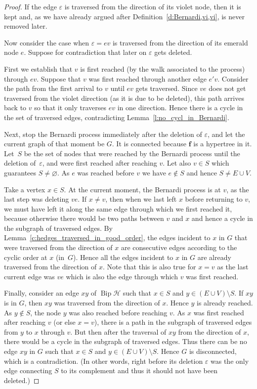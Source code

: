 \documentclass[ALCO,ThmDefs,Unicode,epreuves]{cedram}
\newcommand{\HH}{\mathcal H}
\DeclareMathOperator{\bip}{Bip}
\begin{document}
\begin{proof}
If the edge $\varepsilon$ is traversed from the direction of its violet node, then it is kept and, as we have already argued after Definition~\ref{d:Bernardi,vi,vi}, is never removed later.
	
Now consider the case when $\varepsilon=ev$ is traversed from the direction of its emerald node $e$. Suppose for contradiction that later on $\varepsilon$ gets deleted. 

First we establish that $v$ is first reached (by the walk associated to the process) through $ev$. Suppose that $v$ was first reached through another edge $e'v$. Consider the path from the first arrival to $v$ until $ev$ gets traversed. Since $ve$ does not get traversed from the violet direction (as it is due to be deleted), this path arrives back to $v$ so that it only traverses $ev$ in one direction. Hence there is a cycle in the set of traversed edges, contradicting Lemma~\ref{l:no_cycl_in_Bernardi}.

Next, stop the Bernardi process immediately after the deletion of $\varepsilon$, and let the current graph of that moment be $G$. It is connected because $\mathbf f$ is a hypertree in it. Let~$S$ be the set of nodes that were reached by the Bernardi process until the deletion of~$\varepsilon$, and were first reached after reaching $v$. Let also $v\in S$ which guarantees $S\ne\varnothing$. As $e$ was reached before $v$ we have $e\notin S$ and hence $S\ne E\cup V$.

Take a vertex $x\in S$. At the current moment, the Bernardi process is at $v$, as the last step was deleting $ve$. If $x\neq v$, then when we last left $x$ before returning to $v$, we must have left it along the same edge through which we first reached it, because otherwise there would be two paths between $v$ and $x$ and hence a cycle in the subgraph of traversed edges. By Lemma~\ref{c:hedges_traversed_in_good_order}, the edges incident to $x$ in $G$ that were traversed from the direction of $x$ are consecutive edges according to the cyclic order at $x$ (in~$G$). Hence all the edges incident to $x$ in $G$ are already traversed from the direction of $x$. Note that this is also true for $x=v$ as the last current edge was $ve$ which is also the edge through which $v$ was first reached.

Finally, consider an edge $xy$ of $\bip \HH$ such that $x\in S$ and $y\in (E\cup V) \setminus S$. If $xy$ is in $G$, then $xy$ was traversed from the direction of $x$. Hence $y$ is already reached. As $y\notin S$, the node $y$ was also reached before reaching $v$. As $x$ was first reached after reaching $v$ (or else $x=v$), there is a path in the subgraph of traversed edges from $y$ to $x$ through $v$. But then after the traversal of $xy$ from the direction of $x$, there would be a cycle in the subgraph of traversed edges. Thus there can be no edge $xy$ in $G$ such that $x\in S$ and $y\in (E\cup V) \setminus S$. Hence $G$ is disconnected, which is a contradiction. (In other words, right before its deletion $\varepsilon$ was the only edge connecting $S$ to its complement and thus it should not have been deleted.)
\end{proof}
\end{document}
